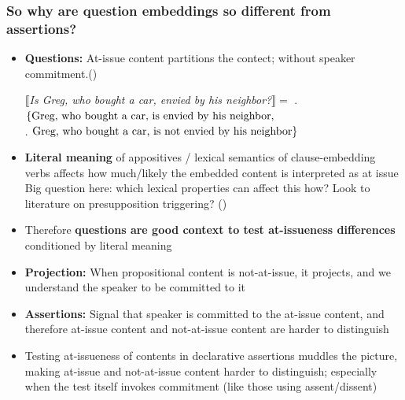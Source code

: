 \documentclass[compress, xcolor = dvipsnames, aspectratio=169, handout]{beamer}
\begin{document}
	\begin{frame}[t]\frametitle{So why are question embeddings so different from assertions?}\scriptsize 
		\begin{itemize}[<+->]
			\item \textbf{Questions:} At-issue content partitions the contect; without speaker commitment\newline \phantom.\hfill {\scriptsize(\citealt{groenendijk_studies_1984,ginzburg_interrogatives_1996,roberts_information_1996,tonhauser_how_2018})}\smallskip

			$\llbracket$\emph{Is Greg, who bought a car, envied by his neighbor?}$\rrbracket =$
			\phantom. \hfill $\{\textnormal{Greg, who bought a car, is envied by his neighbor},$\\
			\phantom. \hfill$\textnormal{Greg, who bought a car, is not envied by his neighbor}\}$\medskip

			\item \textbf{Literal meaning} of appositives / lexical semantics of clause-embedding verbs affects how much/likely the embedded content is interpreted as at issue\smallskip\\ 
			{\scriptsize Big question here: which lexical properties can affect this how? Look to literature on presupposition triggering? (\citealt{abrusan_predicting_2011,schlenker_triggering_2021,anand_facts_2024,scontras_projection_2025})}\medskip

			\item Therefore \textbf{questions are good context to test at-issueness differences} conditioned by literal meaning\medskip

			\item \textbf{Projection:} When propositional content is not-at-issue, it projects, and we understand the speaker to be committed to it\medskip

			\item \textbf{Assertions:} Signal that speaker is committed to the at-issue content, and therefore at-issue content and not-at-issue content are harder to distinguish\medskip

			\item Testing at-issueness of contents in declarative assertions muddles the picture, making at-issue and not-at-issue content harder to distinguish; especially when the test itself invokes commitment (like those using assent/dissent)

		\end{itemize}
	
	\end{frame}
	
\end{document}
